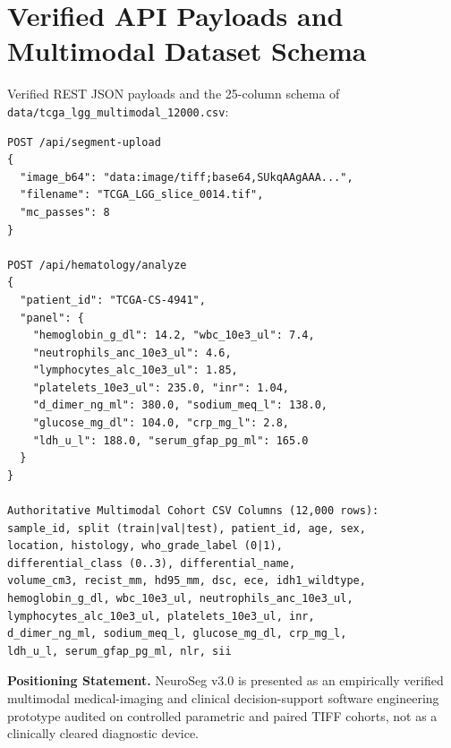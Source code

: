 \documentclass[conference]{IEEEtran}
\begin{document}
\section{Verified API Payloads and Multimodal Dataset Schema}
Verified REST JSON payloads and the 25-column schema of \texttt{data/tcga\_lgg\_multimodal\_12000.csv}:
\begin{verbatim}
POST /api/segment-upload
{
  "image_b64": "data:image/tiff;base64,SUkqAAgAAA...",
  "filename": "TCGA_LGG_slice_0014.tif",
  "mc_passes": 8
}

POST /api/hematology/analyze
{
  "patient_id": "TCGA-CS-4941",
  "panel": {
    "hemoglobin_g_dl": 14.2, "wbc_10e3_ul": 7.4,
    "neutrophils_anc_10e3_ul": 4.6,
    "lymphocytes_alc_10e3_ul": 1.85,
    "platelets_10e3_ul": 235.0, "inr": 1.04,
    "d_dimer_ng_ml": 380.0, "sodium_meq_l": 138.0,
    "glucose_mg_dl": 104.0, "crp_mg_l": 2.8,
    "ldh_u_l": 188.0, "serum_gfap_pg_ml": 165.0
  }
}

Authoritative Multimodal Cohort CSV Columns (12,000 rows):
sample_id, split (train|val|test), patient_id, age, sex,
location, histology, who_grade_label (0|1),
differential_class (0..3), differential_name,
volume_cm3, recist_mm, hd95_mm, dsc, ece, idh1_wildtype,
hemoglobin_g_dl, wbc_10e3_ul, neutrophils_anc_10e3_ul,
lymphocytes_alc_10e3_ul, platelets_10e3_ul, inr,
d_dimer_ng_ml, sodium_meq_l, glucose_mg_dl, crp_mg_l,
ldh_u_l, serum_gfap_pg_ml, nlr, sii
\end{verbatim}

\textbf{Positioning Statement.} NeuroSeg v3.0 is presented as an empirically verified multimodal medical-imaging and clinical decision-support software engineering prototype audited on controlled parametric and paired TIFF cohorts, not as a clinically cleared diagnostic device.
\end{document}

